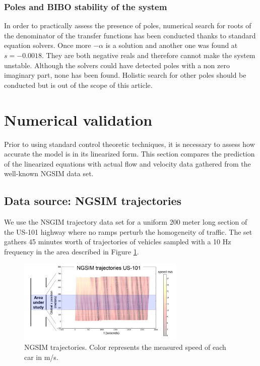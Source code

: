 \documentclass[a4paper, 10pt, conference]{ieeeconf}      %
\begin{document}
\subsubsection{Poles and BIBO stability of the system}
In order to practically assess the presence of poles, numerical search for roots of the denominator of the transfer functions has been conducted thanks to standard equation solvers. Once more $-\alpha$ is a solution and another one was found at $s=-0.0018$. They are both negative reals and therefore cannot make the system unstable. Although the solvers could have detected poles with a non zero imaginary part, none has been found. Holistic search for other poles should be conducted but is out of the scope of this article.


\section{Numerical validation}
Prior to using standard control theoretic techniques, it is necessary to assess how accurate the model is in its linearized form. This section compares the prediction of the linearized equations with actual flow and velocity data gathered from the well-known NGSIM data set.


\subsection{Data source: NGSIM trajectories}
We use the NSGIM trajectory data set for a uniform 200 meter long section of the US-101 highway where no ramps perturb the homogeneity of traffic. The set gathers 45 minutes worth of trajectories of vehicles sampled with a 10 Hz frequency in the area described in Figure \ref{fig:NGSIM-trajectories}.

\begin{figure}
\centering
\includegraphics[width=8cm, trim = 10mm 10mm 10mm 10mm]{US-101_all_traj_low_res_mod}
\protect\caption{NGSIM trajectories. Color represents the measured speed of each
car in m/s.}
\label{fig:NGSIM-trajectories}
\end{figure}
\end{document}
